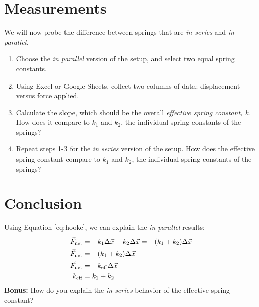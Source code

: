 \documentclass{article}
\begin{document}
\section{Measurements}
We will now probe the difference between springs that are \textit{in series} and \textit{in parallel}.
\begin{enumerate}
\item Choose the \textit{in parallel} version of the setup, and select two equal spring constants.
\item Using Excel or Google Sheets, collect two columns of data: displacement versus force applied.
\item Calculate the slope, which should be the overall \textit{effective spring constant, k}.  How does it compare to $k_1$ and $k_2$, the individual spring constants of the springs?
\item Repeat steps 1-3 for the \textit{in series} version of the setup.  How does the effective spring constant compare to $k_1$ and $k_2$, the individual spring constants of the springs?
\end{enumerate}

\section{Conclusion}
Using Equation \ref{eq:hooke}, we can explain the \textit{in parallel} results:
\begin{align}
\vec{F}_{\rm net} &= -k_1\Delta \vec{x} - k_2\Delta \vec{x} = -(k_1 + k_2)\Delta \vec{x} \\
\vec{F}_{\rm net} &= -(k_1 + k_2)\Delta \vec{x} \\
\vec{F}_{\rm net} &= -k_{\rm eff}\Delta\vec{x} \\
k_{\rm eff} &= k_1 + k_2
\end{align}
\textbf{Bonus:} How do you explain the \textit{in series} behavior of the effective spring constant?
\end{document}
